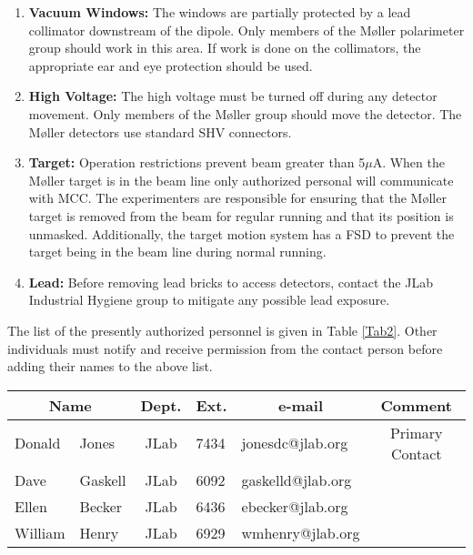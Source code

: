 \begin{safetyen}{0}{0}
\begin{enumerate}
{}
\item{{\bf Vacuum Windows:}
The windows are partially protected by a lead collimator downstream
of the dipole. Only members of the M{\o}ller polarimeter group should work 
in this area. If work is done on the collimators, the appropriate ear
and eye protection should be used.
}
\item{{\bf High Voltage:}
The high voltage must be turned
off during any detector movement. Only members of the M{\o}ller group should move the detector.
The M{\o}ller detectors use standard SHV connectors. }
\item{{\bf Target:}
Operation restrictions prevent beam greater than 5$\mu$A.  When the M{\o}ller target is in the beam line only authorized personal will communicate with MCC.  The experimenters are responsible for ensuring that the M{\o}ller target is 
removed from the beam for regular running and that its position is unmasked.  Additionally, the target motion system has a FSD to prevent the target being in the beam line during normal running.   
}
        \item{{\bf Lead:} Before removing lead bricks to access detectors, contact the JLab Industrial Hygiene group to mitigate any possible lead exposure.
}
\end{enumerate}

\label{sec:moller-pers}
\vspace{-\parskip}
The list
of the presently authorized personnel is given in Table \ref{Tab2}.
Other individuals must notify and receive permission from
the contact person before adding their names 
to the above list.
\begin{table}[ht]
\begin{center}
\begin{tabular}{|ll|c|l|l|c|} \hline
  \multicolumn{2}{|c|}{Name} & Dept. & Ext. & 
  \multicolumn{1}{c|}{e-mail} & Comment \\ 
\hline
Donald & Jones & JLab &  7434 & jonesdc@jlab.org & Primary Contact \\
Dave & Gaskell & JLab &  6092 & gaskelld@jlab.org & \\
Ellen & Becker  & JLab    & 6436 & ebecker@jlab.org      &     \\
  William & Henry & JLab &  6929 & wmhenry@jlab.org & \\


\end{tabular}
\end{center}
\end{table}
\end{safetyen}
